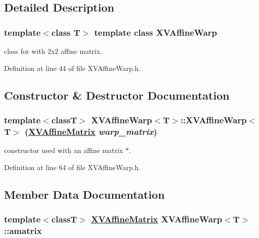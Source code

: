 \subsection{Detailed Description}
\subsubsection*{template$<$class T$>$  template class XVAffine\-Warp}

class for with 2x2 affine matrix.





Definition at line 44 of file XVAffine\-Warp.h.

\subsection{Constructor \& Destructor Documentation}
\label{XVAffineWarp_a4}
\hypertarget{class_XVAffineWarp_a4}{
\subsubsection[XVAffineWarp]{\setlength{\rightskip}{0pt plus 5cm}template$<$classT$>$ XVAffine\-Warp$<$T$>$::XVAffine\-Warp$<$T$>$ (\hyperlink{class_XVAffineMatrix}{XVAffine\-Matrix} {\em warp\_\-matrix})}}


constructor used with an affine matrix $\ast$.



Definition at line 64 of file XVAffine\-Warp.h.

\subsection{Member Data Documentation}
\label{XVAffineWarp_o0}
\hypertarget{class_XVAffineWarp_o0}{
\subsubsection[amatrix]{\setlength{\rightskip}{0pt plus 5cm}template$<$classT$>$ \hyperlink{class_XVAffineMatrix}{XVAffine\-Matrix} XVAffine\-Warp$<$T$>$::amatrix}}


